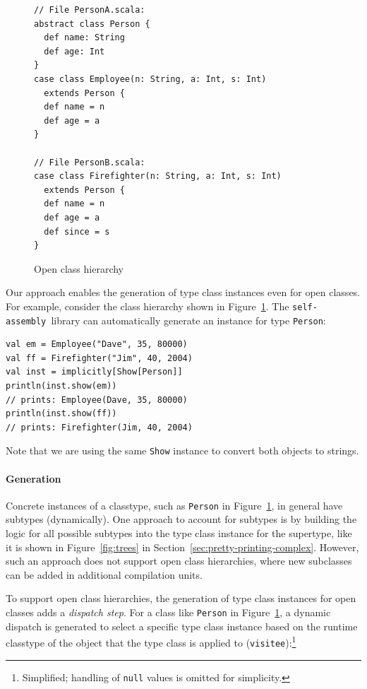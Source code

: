 \documentclass[preprint,nocopyrightspace]{sigplanconf}
\newcommand{\selfassembly}{\texttt{self-assembly~}}
\begin{document}
\begin{figure}
\centering
\begin{lstlisting}
// File PersonA.scala:
abstract class Person {
  def name: String
  def age: Int
}
case class Employee(n: String, a: Int, s: Int)
  extends Person {
  def name = n
  def age = a
}

// File PersonB.scala:
case class Firefighter(n: String, a: Int, s: Int)
  extends Person {
  def name = n
  def age = a
  def since = s
}
\end{lstlisting}
  \caption{Open class hierarchy}
  \label{fig:class-hierarchy}
\end{figure}

Our approach enables the generation of type class instances even for open
classes. For example, consider the class hierarchy shown in
Figure~\ref{fig:class-hierarchy}. The \selfassembly library can automatically generate
an instance for type \verb|Person|:

\begin{lstlisting}
val em = Employee("Dave", 35, 80000)
val ff = Firefighter("Jim", 40, 2004)
val inst = implicitly[Show[Person]]
println(inst.show(em))
// prints: Employee(Dave, 35, 80000)
println(inst.show(ff))
// prints: Firefighter(Jim, 40, 2004)
\end{lstlisting}
\noindent
Note that we are using the same \verb|Show| instance to convert both objects
to strings.

\paragraph{Generation}

Concrete instances of a classtype, such as \verb|Person| in
Figure~\ref{fig:class-hierarchy}, in general have subtypes (dynamically). One approach to
account for subtypes is by building the logic for all possible subtypes into
the type class instance for the supertype, like it is shown in
Figure~\ref{fig:trees} in Section~\ref{sec:pretty-printing-complex}.
However, such an approach does not support open class hierarchies, where new subclasses can be
added in additional compilation units.

To support open class hierarchies, the generation of type class instances for
open classes adds a {\em dispatch step}. For a class like \verb|Person| in
Figure~\ref{fig:class-hierarchy}, a dynamic dispatch is generated to select a
specific type class instance based on the runtime classtype of the object that the type
class is applied to (\verb|visitee|):\footnote{Simplified; handling of \texttt{null} values is omitted for simplicity.}
\end{document}
